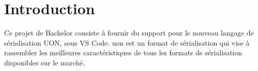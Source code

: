 \documentclass[
    iict, %
    il, %
]{heig-tb}
\begin{document}
\maketitle
\frontmatter
\clearemptydoublepage

\preamble
\let\cleardoublepage\clearpage
\authentification
\let\cleardoublepage\clearpage

\begin{abstract}
    
\end{abstract}

\listoffigures
{}
\listoflistings
{}

\tableofcontents

\printnomenclature
\clearemptydoublepage
{}

\pagestyle{fancy}
\fancyhf{}
\renewcommand\headrulewidth{1pt}

\fancyhead[L]{\itshape\nouppercase{\leftmark}}

\renewcommand{\chaptermark}[1]{\markboth{\MakeUppercase{#1}}{}}

\renewcommand\footrulewidth{1pt}


\renewcommand{\headrulewidth}{0.4pt}
\renewcommand{\footrulewidth}{0.4pt}

\titlespacing*{\chapter}{0pt}{-40pt}{20pt}

\mainmatter
\chapter{Introduction}


Ce projet de Bachelor consiste à fournir du support pour le nouveau langage de sérialisation UON, sous VS Code.
\Gls{uon} est un format de sérialisation qui vise à rassembler les meilleures caractéristiques de tous les formats de sérialisation disponibles sur le marché.
\end{document}
